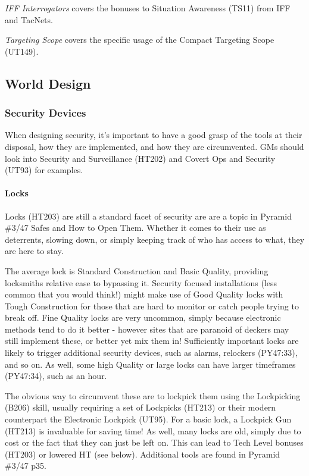 \begin{multicols*}{2}
	\textit{IFF Interrogators} covers the bonuses to Situation Awareness (TS11) from IFF and TacNets.
	
	\textit{Targeting Scope} covers the specific usage of the Compact Targeting Scope (UT149).
	
	\subsection{World Design}
	
	\subsubsection{Security Devices}
	
	When designing security, it's important to have a good grasp of the tools at their disposal, how they are implemented, and how they are circumvented. GMs should look into Security and Surveillance (HT202) and Covert Ops and Security (UT93) for examples.
	
	\paragraph{Locks}
	
	Locks (HT203) are still a standard facet of security are are a topic in Pyramid \#3/47 Safes and How to Open Them. Whether it comes to their use as deterrents, slowing down, or simply keeping track of who has access to what, they are here to stay. 
	
	The average lock is Standard Construction and Basic Quality, providing locksmiths relative ease to bypassing it. Security focused installations (less common that you would think!) might make use of Good Quality locks with Tough Construction for those that are hard to monitor or catch people trying to break off. Fine Quality locks are very uncommon, simply because electronic methods tend to do it better - however sites that are paranoid of deckers may still implement these, or better yet mix them in! Sufficiently important locks are likely to trigger additional security devices, such as alarms, relockers (PY47:33), and so on. As well, some high Quality or large locks can have larger timeframes (PY47:34), such as an hour.
	
	The obvious way to circumvent these are to lockpick them using the Lockpicking (B206) skill, usually requiring a set of Lockpicks (HT213) or their modern counterpart the Electronic Lockpick (UT95). For a basic lock, a Lockpick Gun (HT213) is invaluable for saving time! As well, many locks are old, simply due to cost or the fact that they can just be left on. This can lead to Tech Level bonuses (HT203) or lowered HT (see below). Additional tools are found in Pyramid \#3/47 p35.
	

\end{multicols*}
